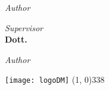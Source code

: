 \begin{titlepage}
\begin{center}
{\begin{large}
    \vspace*{-4.23cm} 

    \begin{flushright}
    \textit{Author}\\ 
    \vspace{5pt} 
    \textbf{\myName}
    \end{flushright}
    \end{large}
}{
    \begin{large}
    \begin{flushleft}
    \textit{Supervisor}\\ 
    \vspace{5pt} 
    \textbf{Dott. \mySupervisor}
    \end{flushleft}

    \vspace*{-2.36cm} 

    \begin{flushright}
    \textit{Author}\\ 
    \vspace{5pt} 
    \textbf{\myName}
    \end{flushright}
    \end{large}
}

\vfill
\texttt{[image: logoDM]}
\line(1, 0){338} \\
\begin{normalsize}
\textsc{\myTime}
\end{normalsize}

\end{center}
\end{titlepage}
